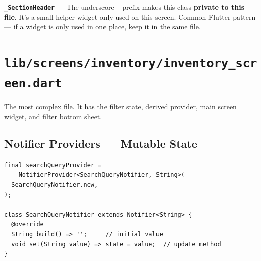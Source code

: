\documentclass[11pt, a4paper]{article}
\begin{document}
\textbf{\texttt{\_SectionHeader}} --- The underscore \texttt{\_} prefix makes this class \textbf{private to this file}. It's a small helper widget only used on this screen. Common Flutter pattern --- if a widget is only used in one place, keep it in the same file.

\newpage

\section{\texttt{lib/screens/inventory/inventory\_screen.dart}}

The most complex file. It has the filter state, derived provider, main screen widget, and filter bottom sheet.

\subsection{Notifier Providers --- Mutable State}

\begin{lstlisting}
final searchQueryProvider =
    NotifierProvider<SearchQueryNotifier, String>(
  SearchQueryNotifier.new,
);

class SearchQueryNotifier extends Notifier<String> {
  @override
  String build() => '';     // initial value
  void set(String value) => state = value;  // update method
}
\end{lstlisting}
\end{document}
